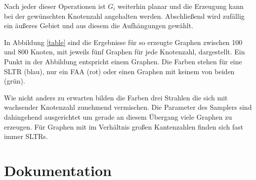 Nach jeder dieser Operationen ist $G_i$ weiterhin planar und die Erzeugung kann bei der gewünschten Knotenzahl angehalten werden. Abschließend wird zufällig ein äußeres Gebiet und aus diesem die Aufhängungen gewählt.

In Abbildung \ref{table} sind die Ergebnisse für so erzeugte Graphen zwischen 100 und 800 Knoten, mit jeweils fünf Graphen für jede Knotenzahl, dargestellt. Ein Punkt in der Abbildung entspricht einem Graphen. Die Farben stehen für eine SLTR (blau), nur ein FAA (rot) oder einen Graphen mit keinem von beiden (grün). 



Wie nicht anders zu erwarten bilden die Farben drei Strahlen die sich mit wachsender Knotenzahl zunehmend vermischen. Die Parameter des Samplers sind dahingehend ausgerichtet um gerade an diesem Übergang viele Graphen zu erzeugen. Für Graphen mit im Verhältnis großen Kantenzahlen finden sich fast immer SLTRs.

\section{Dokumentation}

